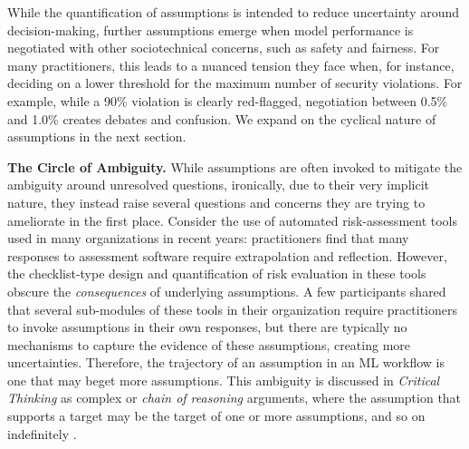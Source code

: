 While the quantification of assumptions is intended to reduce uncertainty around decision-making, further assumptions emerge when model performance is negotiated with other sociotechnical concerns, such as safety and fairness. For many practitioners, this leads to a nuanced tension they face when, for instance, deciding on a lower threshold for the maximum number of security violations. For example, while a 90\% violation is clearly red-flagged, negotiation between 0.5\% and 1.0\% creates debates and confusion. We expand on the cyclical nature of assumptions in the next section.







\smallskip
\noindent \textbf{The Circle of Ambiguity.}
While assumptions are often invoked to mitigate the ambiguity around unresolved questions, ironically, due to their very implicit nature, they instead raise several questions and concerns they are trying to ameliorate in the first place. Consider the use of automated risk-assessment tools used in many organizations in recent years: practitioners find that many responses to assessment software require extrapolation and reflection. However, the checklist-type design and quantification of risk evaluation in these tools obscure the \textit{consequences} of underlying assumptions. A few participants shared that several sub-modules of these tools in their organization require practitioners to invoke assumptions in their own responses, but there are typically no mechanisms to capture the evidence of these assumptions, creating more uncertainties. Therefore, the trajectory of an assumption in an ML workflow is one that may beget more assumptions. This ambiguity is discussed in \textit{Critical Thinking} as complex or \textit{chain of reasoning} arguments, where the assumption that supports a target may be the target of one or more assumptions, and so on indefinitely \cite{hitchcock2021concept}. 

